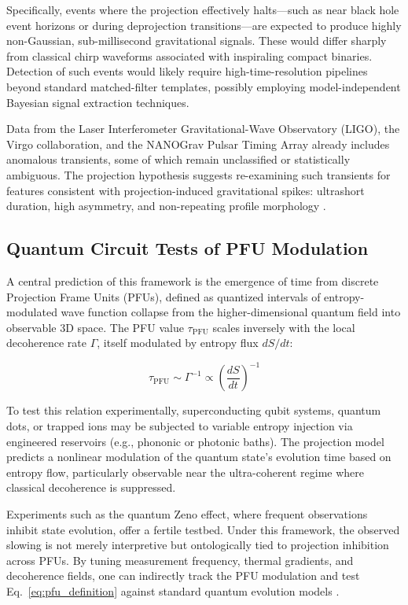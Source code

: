\documentclass[12pt,a4paper]{article}
\numberwithin{equation}{section}
\begin{document}
Specifically, events where the projection effectively halts—such as near black hole event horizons or during deprojection transitions—are expected to produce highly non-Gaussian, sub-millisecond gravitational signals. These would differ sharply from classical chirp waveforms associated with inspiraling compact binaries. Detection of such events would likely require high-time-resolution pipelines beyond standard matched-filter templates, possibly employing model-independent Bayesian signal extraction techniques.

Data from the Laser Interferometer Gravitational-Wave Observatory (LIGO), the Virgo collaboration, and the NANOGrav Pulsar Timing Array already includes anomalous transients, some of which remain unclassified or statistically ambiguous. The projection hypothesis suggests re-examining such transients for features consistent with projection-induced gravitational spikes: ultrashort duration, high asymmetry, and non-repeating profile morphology \cite{abbott_observation_2016, arzoumanian_nanograv_2020}.

\subsection{Quantum Circuit Tests of PFU Modulation}

A central prediction of this framework is the emergence of time from discrete Projection Frame Units (PFUs), defined as quantized intervals of entropy-modulated wave function collapse from the higher-dimensional quantum field into observable 3D space. The PFU value \(\tau_{\text{PFU}}\) scales inversely with the local decoherence rate \(\Gamma\), itself modulated by entropy flux \(dS/dt\):

\begin{equation}
\tau_{\text{PFU}} \sim \Gamma^{-1} \propto \left(\frac{dS}{dt}\right)^{-1}
\label{eq:pfu_definition}
\end{equation}

To test this relation experimentally, superconducting qubit systems, quantum dots, or trapped ions may be subjected to variable entropy injection via engineered reservoirs (e.g., phononic or photonic baths). The projection model predicts a nonlinear modulation of the quantum state's evolution time based on entropy flow, particularly observable near the ultra-coherent regime where classical decoherence is suppressed.

Experiments such as the quantum Zeno effect, where frequent observations inhibit state evolution, offer a fertile testbed. Under this framework, the observed slowing is not merely interpretive but ontologically tied to projection inhibition across PFUs. By tuning measurement frequency, thermal gradients, and decoherence fields, one can indirectly track the PFU modulation and test Eq.~\eqref{eq:pfu_definition} against standard quantum evolution models \cite{itano_quantum_1990}.
\end{document}
